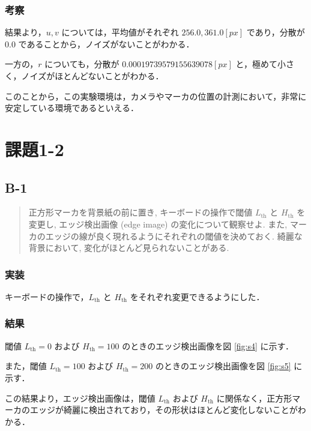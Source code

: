 \documentclass[fleqn, a4paper. 12pt]{jsarticle}
\begin{document}
      \subsubsection*{考察}

        結果より，\( u, v \) については，平均値がそれぞれ \( 256.0, 361.0 [px] \) であり，分散が \( 0.0 \) であることから，ノイズがないことがわかる．

        一方の，\( r \) についても，分散が \( 0.00019739579155639078 [px]\) と，極めて小さく，ノイズがほとんどないことがわかる．

        このことから，この実験環境は，カメラやマーカの位置の計測において，非常に安定している環境であるといえる．

  \section*{課題1-2}

    \subsection*{B-1}

      \begin{quote}
        正方形マーカを背景紙の前に置き, キーボードの操作で閾値 \( L_{\text{th}} \) と \( H_{\text{th}} \) を変更し, エッジ検出画像 (edge image) の変化について観察せよ. また, マーカのエッジの線が良く現れるようにそれぞれの閾値を決めておく. 綺麗な背景において, 変化がほとんど見られないことがある.
      \end{quote}

      \subsubsection*{実装}

        キーボードの操作で，\( L_{\text{th}} \) と \( H_{\text{th}} \) をそれぞれ変更できるようにした．

      \subsubsection*{結果}

        閾値 \( L_{\text{th}} = 0 \) および \( H_{\text{th}} = 100 \) のときのエッジ検出画像を図 \ref{fig:s4} に示す．

        また，閾値 \( L_{\text{th}} = 100 \) および \( H_{\text{th}} = 200 \) のときのエッジ検出画像を図 \ref{fig:s5} に示す．

        この結果より，エッジ検出画像は，閾値 \( L_{\text{th}} \) および \( H_{\text{th}} \) に関係なく，正方形マーカのエッジが綺麗に検出されており，その形状はほとんど変化しないことがわかる．
\end{document}
